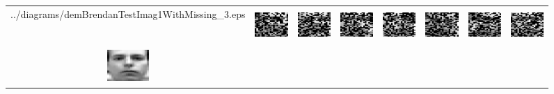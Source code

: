 \documentclass[twoside,times]{article}
\begin{document}
\begin{figure}[ht]
\begin{center}
\begin{tabular}{cccccccc}
{../diagrams/demBrendanTestImag1WithMissing_3.eps}&
\includegraphics[width=16mm,height=13mm]
{../diagrams/demBrendanTestImag2WithMissing_3.eps} &
\includegraphics[width=16mm,height=13mm]
{../diagrams/demBrendanTestImag4WithMissing_3.eps}&
\includegraphics[width=16mm,height=13mm]
{../diagrams/demBrendanTestImag11WithMissing_3.eps}&
\includegraphics[width=16mm,height=13mm]
{../diagrams/demBrendanTestImag24WithMissing_3.eps}&
\includegraphics[width=16mm,height=13mm]
{../diagrams/demBrendanTestImag51WithMissing_3.eps}&
\includegraphics[width=16mm,height=13mm]
{../diagrams/demBrendanTestImag62WithMissing_3.eps}&
\includegraphics[width=16mm,height=13mm]
{../diagrams/demBrendanTestImag127WithMissing_3.eps}\\
\includegraphics[width=16mm,height=13mm]
{../diagrams/demBrendanTestImag1Reconst_3.eps}&
\includegraphics[width=16mm,height=13mm]

\end{tabular}
\end{center}
\end{figure}
\end{document}
